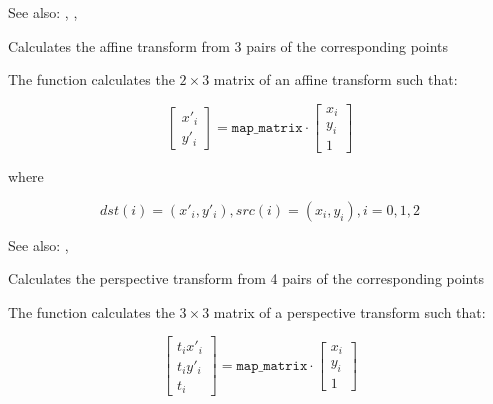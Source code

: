 See also: , , 

Calculates the affine transform from 3 pairs of the corresponding points


\begin{description}
\end{description}

The function calculates the $2 \times 3$ matrix of an affine transform such that:

\[
\begin{bmatrix}
x'_i\\
y'_i
\end{bmatrix}
=
\texttt{map\_matrix}
\cdot
\begin{bmatrix}
x_i\\
y_i\\
1
\end{bmatrix}
\]

where

\[
dst(i)=(x'_i,y'_i),
src(i)=(x_i, y_i),
i=0,1,2
\]

See also: , 

Calculates the perspective transform from 4 pairs of the corresponding points


\begin{description}
\end{description}

The function calculates the $3 \times 3$ matrix of a perspective transform such that:

\[
\begin{bmatrix}
t_i x'_i\\
t_i y'_i\\
t_i
\end{bmatrix}
=
\texttt{map\_matrix}
\cdot
\begin{bmatrix}
x_i\\
y_i\\
1
\end{bmatrix}
\]

